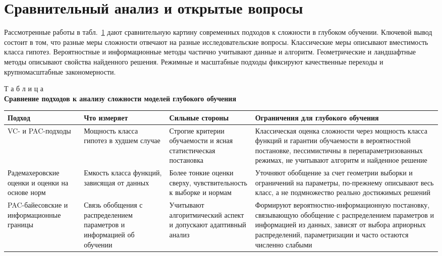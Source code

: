 \section{Сравнительный анализ и открытые вопросы}

Рассмотренные работы в табл.~\ref{tab:ch0sv_comparison} дают сравнительную картину современных подходов к сложности в глубоком обучении.
Ключевой вывод состоит в том, что разные меры сложности отвечают на разные исследовательские вопросы.
Классические меры описывают вместимость класса гипотез.
Вероятностные и информационные методы частично учитывают данные и алгоритм.
Геометрические и ландшафтные методы описывают свойства найденного решения.
Режимные и масштабные подходы фиксируют качественные переходы и крупномасштабные закономерности.

\begin{table}[htbp]
\label{tab:ch0sv_comparison}
\begin{flushright}
{Т а б л и ц а \thetable}\\
\centering
\textbf{Сравнение подходов к анализу сложности моделей глубокого обучения}
\end{flushright}
\centering
\scriptsize
\setlength{\tabcolsep}{3pt}
\begin{tabular}{|>{\raggedright\arraybackslash}m{1.0in}|>{\raggedright\arraybackslash}m{1.15in}|>{\raggedright\arraybackslash}m{1.45in}|>{\raggedright\arraybackslash}m{1.65in}|}
\hline
Подход & Что измеряет & Сильные стороны & Ограничения для глубокого обучения \\
\hline
VC- и PAC-подходы & Мощность класса гипотез в худшем случае & Строгие критерии обучаемости и ясная статистическая постановка & Классическая оценка сложности через мощность класса функций и гарантии обучаемости в вероятностной постановке, пессимистичны в перепараметризованных режимах, не учитывают алгоритм и найденное решение \\
\hline
Радемахеровские оценки и оценки на основе норм & Емкость класса функций, зависящая от данных & Более тонкие оценки сверху, чувствительность к выборке и нормам & Уточняют обобщение за счет геометрии выборки и ограничений на параметры, по-прежнему описывают весь класс, а не подмножество реально достижимых решений \\
\hline
PAC-байесовские и информационные границы & Связь обобщения с распределением параметров и информацией об обучении & Учитывают алгоритмический аспект и допускают адаптивный анализ & Формируют вероятностно-информационную постановку, связывающую обобщение с распределением параметров и информацией из данных, зависят от выбора априорных распределений, параметризации и часто остаются численно слабыми \\

\end{tabular}
\end{table}

